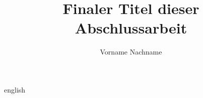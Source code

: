 

\title{Finaler Titel dieser Abschlussarbeit}
\author{Vorname Nachname}






\tableofcontents
\clearpage

\begin{abstract}
	\thispagestyle{plain}
	\setcounter{page}{3}
	
\end{abstract}
\clearpage

\begin{otherlanguage*}{english}
\begin{abstract}
	\thispagestyle{plain}
	\setcounter{page}{4}
	
\end{abstract}
\end{otherlanguage*}









\listoffigures
\listoftables
\printbibliography[heading=bibintoc]





